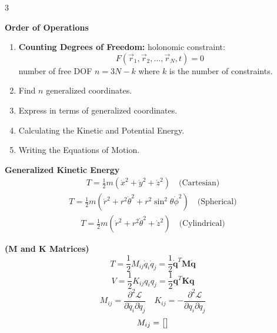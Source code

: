 \documentclass[1pt]{article}
\begin{document}
\begin{multicols}{3} %
\raggedcolumns
\setlength{\columnseprule}{0.1pt}
\scriptsize %
\noindent %
\abovedisplayskip=2pt
\belowdisplayskip=2pt


\textbf{Order of Operations}
\begin{enumerate}[noitemsep, topsep=0pt]
    \item \textbf{Counting Degrees of Freedom:}
    holonomic constraint:
    \begin{equation*}
        F\left(\vec{r}_1, \vec{r}_2, \ldots, \vec{r}_N, t\right)=0
    \end{equation*}
    number of free DOF \( n=3N-k \) where \( k \) is the number of constraints.
    \item Find \( n \) generalized coordinates.  
    \item Express in terms of generalized coordinates.  
    \item Calculating the Kinetic and Potential Energy.  
    \item Writing the Equations of Motion.
\end{enumerate}

\textbf{Generalized Kinetic Energy}
\begin{align*}
     T = \frac{1}{2} m (\dot{x}^2 + \dot{y}^2 + \dot{z}^2) \quad \text{(Cartesian)} 
\end{align*}
\begin{align*}
    T = \frac{1}{2} m (\dot{r}^2 + r^2 \dot{\theta}^2 + r^2 \sin^2 \theta \dot{\phi}^2) \quad \text{(Spherical)}
\end{align*}
\begin{align*}
    T = \frac{1}{2} m (\dot{r}^2 + r^2 \dot{\theta}^2 + \dot{z}^2) \quad \text{(Cylindrical)}
\end{align*}


\textbf{(M and K Matrices)}
\begin{equation*}
       T = \frac{1}{2} M_{ij} \dot{q}_i \dot{q}_j = \frac{1}{2} \mathbf{\dot{q}}^T \mathbf{M} \mathbf{\dot{q}}
\end{equation*}
\begin{equation*}
    V = \frac{1}{2} K_{ij} q_i q_j = \frac{1}{2} \mathbf{q}^T \mathbf{K} \mathbf{q}
\end{equation*}
\begin{equation*}
M_{ij} = \frac{\partial^2 \mathcal{L}}{\partial \dot{q}_i \partial \dot{q}_j} \quad
K_{ij} = -\frac{\partial^2 \mathcal{L}}{\partial q_i \partial q_j} 
\end{equation*}
\[
M_{ij} =
\begin{bmatrix}\tiny{}


\end{bmatrix}\]
\end{multicols}
\end{document}
